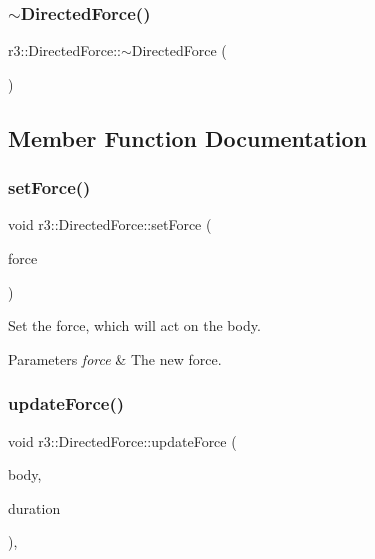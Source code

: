 \subsubsection{\texorpdfstring{$\sim$\+Directed\+Force()}{~DirectedForce()}}
{\footnotesize\ttfamily r3\+::\+Directed\+Force\+::$\sim$\+Directed\+Force (\begin{DoxyParamCaption}{ }\end{DoxyParamCaption})\hspace{0.3cm}{\ttfamily [default]}}



\subsection{Member Function Documentation}
\mbox{\label{classr3_1_1_directed_force_a5c25cdaa94e053ffd2614472d2a04c7e}} 
\subsubsection{\texorpdfstring{set\+Force()}{setForce()}}
{\footnotesize\ttfamily void r3\+::\+Directed\+Force\+::set\+Force (\begin{DoxyParamCaption}\item[{const glm\+::vec3 \&}]{force }\end{DoxyParamCaption})}



Set the force, which will act on the body. 


\begin{DoxyParams}{Parameters}
{\em force} & The new force. \\
\hline
\end{DoxyParams}
\mbox{\label{classr3_1_1_directed_force_ac723ddeef767956d16fb9d0a1d706bfd}} 
\subsubsection{\texorpdfstring{update\+Force()}{updateForce()}}
{\footnotesize\ttfamily void r3\+::\+Directed\+Force\+::update\+Force (\begin{DoxyParamCaption}\item[{\mbox{\hyperlink{classr3_1_1_rigid_body}{Rigid\+Body}} $\ast$}]{body,  }\item[{\mbox{\hyperlink{namespacer3_ab2016b3e3f743fb735afce242f0dc1eb}{real}}}]{duration }\end{DoxyParamCaption})\hspace{0.3cm}{\ttfamily [override]}, {\ttfamily [virtual]}}



